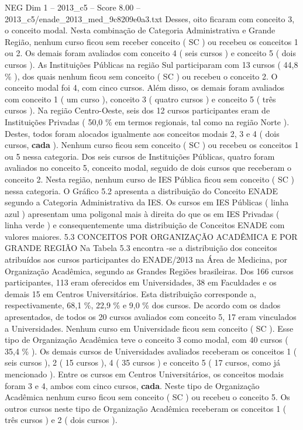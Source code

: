 \begin{textsample}{NEG Dim 1 – 2013\_c5 – Score 8.00 – 2013\_c5/enade\_2013\_med\_9c8209e0a3.txt}
Desses, oito ficaram com conceito 3, o conceito modal.
Nesta combinação de Categoria Administrativa e Grande Região, nenhum curso ficou sem receber conceito ( SC ) ou recebeu os conceitos 1 ou 2.
Os demais foram avaliados com conceito 4 ( seis cursos ) e conceito 5 ( dois cursos ).
As Instituições Públicas na região Sul participaram com 13 cursos ( 44,8 \% ), dos quais nenhum ficou sem conceito ( SC ) ou recebeu o conceito 2.
O conceito modal foi 4, com cinco cursos.
Além disso, os demais foram avaliados com conceito 1 ( um curso ), conceito 3 ( quatro cursos ) e conceito 5 ( três cursos ).
Na região Centro-Oeste, seis dos 12 cursos participantes eram de Instituições Privadas ( 50,0 \% em termos regionais, tal como na região Norte ).
Destes, todos foram alocados igualmente aos conceitos modais 2, 3 e 4 ( dois cursos, \textbf{cada} ).
Nenhum curso ficou sem conceito ( SC ) ou recebeu os conceitos 1 ou 5 nessa categoria.
Dos seis cursos de Instituições Públicas, quatro foram avaliados no conceito 5, conceito modal, seguido de dois cursos que receberam o conceito 2.
Nesta região, nenhum curso de IES Pública ficou sem conceito ( SC ) nessa categoria.
O Gráfico 5.2 apresenta a distribuição do Conceito ENADE segundo a Categoria Administrativa da IES.
Os cursos em IES Públicas ( linha azul ) apresentam uma poligonal mais à direita do que os em IES Privadas ( linha verde ) e consequentemente uma distribuição de Conceitos ENADE com valores maiores. 5.3 CONCEITOS POR ORGANIZAÇÃO ACADÊMICA E POR GRANDE REGIÃO Na Tabela 5.3 encontra -se a distribuição dos conceitos atribuídos aos cursos participantes do ENADE/2013 na Área de Medicina, por Organização Acadêmica, segundo as Grandes Regiões brasileiras.
Dos 166 cursos participantes, 113 eram oferecidos em Universidades, 38 em Faculdades e os demais 15 em Centros Universitários.
Esta distribuição corresponde a, respectivamente, 68,1 \%, 22,9 \% e 9,0 \% dos cursos.
De acordo com os dados apresentados, de todos os 20 cursos avaliados com conceito 5, 17 eram vinculados a Universidades.
Nenhum curso em Universidade ficou sem conceito ( SC ).
Esse tipo de Organização Acadêmica teve o conceito 3 como modal, com 40 cursos ( 35,4 \% ).
Os demais cursos de Universidades avaliados receberam os conceitos 1 ( seis cursos ), 2 ( 15 cursos ), 4 ( 35 cursos ) e conceito 5 ( 17 cursos, como já mencionado ).
Entre os cursos em Centros Universitários, os conceitos modais foram 3 e 4, ambos com cinco cursos, \textbf{cada}.
Neste tipo de Organização Acadêmica nenhum curso ficou sem conceito ( SC ) ou recebeu o conceito 5.
Os outros cursos neste tipo de Organização Acadêmica receberam os conceitos 1 ( três cursos ) e 2 ( dois cursos ).

\end{textsample}
